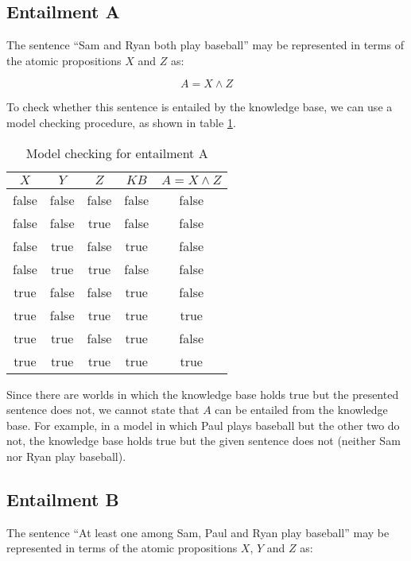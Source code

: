 \documentclass[letterpaper,headings=standardclasses]{scrartcl}
\begin{document}
\subsection{Entailment A}

The sentence ``Sam and Ryan both play baseball'' may be represented in terms of the atomic propositions $X$ and $Z$ as:

$$ A = X \wedge Z $$

To check whether this sentence is entailed by the knowledge base, we can use a model checking procedure, as shown in table \ref{tt_a}.

\begin{table}[h]
    \centering
    \begin{tabular}{|c|c|c|c|c|}
    \hline
    $X$ & $Y$ & $Z$ & $KB$ & $A = X \wedge Z$ \\ \hline
    false & false & false & false & false \\ \hline
    false & false & true & false & false \\ \hline
    false & true & false & true & false \\ \hline
    false & true & true & false & false \\ \hline
    true & false & false & true & false \\ \hline
    true & false & true & true & true \\ \hline
    true & true & false & true & false \\ \hline
    true & true & true & true & true \\ \hline
    \end{tabular}
    \caption{Model checking for entailment A}
    \label{tt_a}
\end{table}

Since there are worlds in which the knowledge base holds true but the presented sentence does not, we cannot state that $A$ can be entailed from the knowledge base. For example, in a model in which Paul plays baseball but the other two do not, the knowledge base holds true but the given sentence does not (neither Sam nor Ryan play baseball).

\subsection{Entailment B}

The sentence ``At least one among Sam, Paul and Ryan play baseball'' may be represented in terms of the atomic propositions $X$, $Y$ and $Z$ as:
\end{document}
